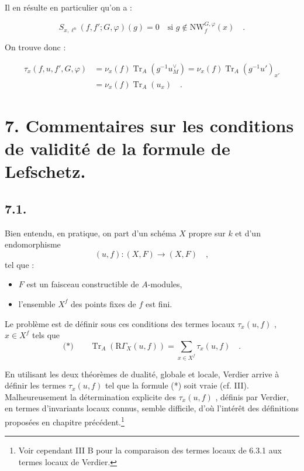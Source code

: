 \documentclass[11pt]{article}
\newcommand{\R}{\mathrm{R}}\newcommand{\RHomCore}{\mathrm{RHom}}
\providecommand{\Tr}{\operatorname{Tr}}
\providecommand{\Tr}{\operatorname{Tr}}
\providecommand{\Tr}{\operatorname{Tr}}
\providecommand{\R}{\mathrm R}
\providecommand{\Tr}{\operatorname{Tr}}
\providecommand{\Tr}{\operatorname{Tr}}
\begin{document}
Il en résulte en particulier qu'on a :

\begin{equation}\tag{6.4.8}
S_{x,\ell^n}(f, f'; G, \varphi)(g) = 0 \quad \text{si } g \notin \mathrm{NW}_{f}^{G,\varphi}(x) \quad .
\end{equation}

On trouve donc :

\begin{equation}\tag{6.4.9}
\begin{aligned}
\tau_x(f,u, f', G, \varphi) &= \nu_x(f) \Tr_A(g^{-1}u_M^\vee) = \nu_x(f) \Tr_A(g^{-1}u')_{x'} \\
&= \nu_x(f) \Tr_A(u_x) \quad .
\end{aligned}
\end{equation}

\section*{7. Commentaires sur les conditions de validité de la formule de Lefschetz.}

\subsection*{7.1.}
Bien entendu, en pratique, on part d'un schéma $X$ propre sur $k$ et d'un endomorphisme
\[
(u, f) : (X, F) \longrightarrow (X, F) \quad ,
\]
tel que :
\begin{itemize}[label=-]
\item $F$ est un faisceau constructible de $A$-modules,
\item l'ensemble $X^f$ des points fixes de $f$ est fini.
\end{itemize}

Le problème est de définir sous ces conditions des termes locaux $\tau_x(u, f)$ , $x \in X^f$ tels que
\[
\text{(*)} \qquad \Tr_A(\R\Gamma_X(u, f)) = \sum_{x \in X^f} \tau_x(u, f) \quad .
\]

En utilisant les deux théorèmes de dualité, globale et locale, Verdier arrive à définir les termes $\tau_x(u, f)$ tel que la formule (*) soit vraie (cf. III). Malheureusement la détermination explicite des $\tau_x(u, f)$ , définis par Verdier, en termes d'invariants locaux connus, semble difficile, d'où l'intérêt des définitions proposées en chapitre précédent.\footnote{Voir cependant III B pour la comparaison des termes locaux de 6.3.1 aux termes locaux de Verdier.}
\end{document}
